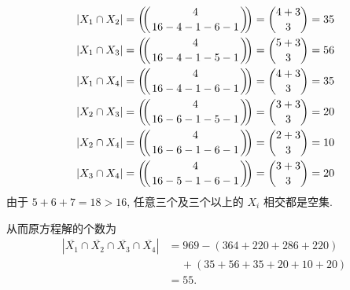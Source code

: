 \documentclass[punct]{ctexbeamer}
\def\multiset#1#2{\ensuremath{\left(\kern-.3em\left(\genfrac{}{}{0pt}{}{#1}{#2}\right)\kern-.3em\right)}}
\begin{document}
\begin{frame}
$$
\begin{aligned}
    &\left|X_{1} \cap X_{2}\right|=\multiset{4}{16-4-1-6-1}=\binom{4+3}{3}=35 \\
    &\left|X_{1} \cap X_{3}\right|=\multiset{4}{16-4-1-5-1}=\binom{5+3}{3}=56 \\
    &\left|X_{1} \cap X_{4}\right|=\multiset{4}{16-4-1-6-1}=\binom{4+3}{3}=35 \\
    &\left|X_{2} \cap X_{3}\right|=\multiset{4}{16-6-1-5-1}=\binom{3+3}{3}=20 \\
    &\left|X_{2} \cap X_{4}\right|=\multiset{4}{16-6-1-6-1}=\binom{2+3}{3}=10 \\
    &\left|X_{3} \cap X_{4}\right|=\multiset{4}{16-5-1-6-1}=\binom{3+3}{3}=20
\end{aligned}
$$
由于 $5+6+7=18>16$, 任意三个及三个以上的 $X_{i}$ 相交都是空集.

从而原方程解的个数为
\begin{align*}
\left|\overline{X_{1}} \cap \overline{X_{2}} \cap \overline{X_{3}} \cap \overline{X_{4}}\right|
& = 969-(364+220+286+220)\\
& \quad \, +(35+56+35+20+10+20)\\
& =55.
\end{align*}

\end{frame}


\end{document}
